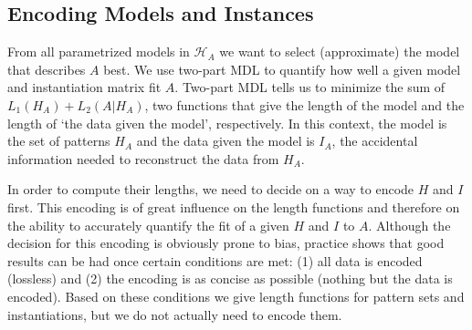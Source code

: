 \documentclass{llncs}
\begin{document}

\subsection{Encoding Models and Instances}

From all parametrized models in $\mathcal{H}_A$ we want to select (approximate) the model that describes $A$ best. We use two-part MDL to quantify how well a given model and instantiation matrix fit $A$. Two-part MDL tells us to minimize the sum of $L_1(H_A) + L_2(A|H_A)$, two functions that give the length of the model and the length of `the data given the model', respectively. In this context, the model is the set of patterns $H_A$ and the data given the model is $I_A$, the accidental information needed to reconstruct the data from $H_A$.

In order to compute their lengths, we need to decide on a way to encode $H$ and $I$ first. This encoding is of great influence on the length functions and therefore on the ability to accurately quantify the fit of a given $H$ and $I$ to $A$. Although the decision for this encoding is obviously prone to bias, practice shows that good results can be had once certain conditions are met: (1) all data is encoded (lossless) and (2) the encoding is as concise as possible (nothing but the data is encoded). Based on these conditions we give length functions for pattern sets and instantiations, but we do not actually need to encode them. 
 
\end{document}
